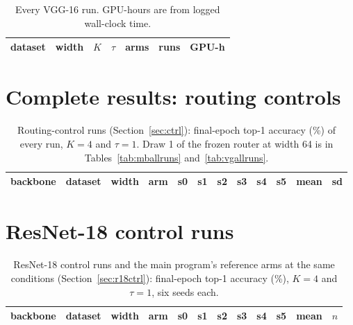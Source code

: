 \documentclass[10pt,a4paper]{article}
\begin{document}
\begin{table}[h]\centering\small
\caption{Every VGG-16 run. GPU-hours are from logged wall-clock time.}
\label{tab:vginvent}
\begin{tabular}{l r r l l r r}
\toprule
dataset & width & $K$ & $\tau$ & arms & runs & GPU-h \\
\midrule
\bottomrule
\end{tabular}
\end{table}

\section{Complete results: routing controls}

\begin{table}[h]\centering\scriptsize
\caption{Routing-control runs (Section~\ref{sec:ctrl}): final-epoch top-1
accuracy (\si{\percent}) of every run, $K=4$ and $\tau=1$. Draw 1 of the
frozen router at width 64 is in Tables~\ref{tab:mballruns}
and~\ref{tab:vgallruns}.}
\label{tab:ctallruns}
\begin{tabular}{l l r l rrrrrr rr}
\toprule
backbone & dataset & width & arm & s0 & s1 & s2 & s3 & s4 & s5 & mean & sd \\
\midrule
\bottomrule
\end{tabular}
\end{table}

\section{ResNet-18 control runs}\label{app:r18runs}

\begin{table}[h]\centering\scriptsize
\caption{ResNet-18 control runs and the main program's reference arms at the same
conditions (Section~\ref{sec:r18ctrl}): final-epoch top-1 accuracy
(\si{\percent}), $K=4$ and $\tau=1$, six seeds each.}
\label{tab:partialruns}
\begin{tabular}{l l r l rrrrrr r r}
\toprule
backbone & dataset & width & arm & s0 & s1 & s2 & s3 & s4 & s5 & mean & $n$ \\
\midrule
\bottomrule
\end{tabular}
\end{table}
\end{document}
